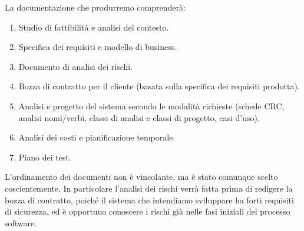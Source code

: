 \documentclass[10pt]{softeng} %
\begin{document}
La documentazione che produrremo comprender\`a:
\begin{enumerate}
	\item Studio di fattibilit\`a e analisi del contesto.
	\item Specifica dei requisiti e modello di business.
	\item Documento di analisi dei rischi.
	\item Bozza di contratto per il cliente (basata sulla specifica dei requisiti prodotta).
	\item Analisi e progetto del sistema secondo le modalit\`a richieste (schede CRC, analisi nomi/verbi, classi di analisi e classi di progetto, casi d'uso).
	\item Analisi dei costi e pianificazione temporale.
	\item Piano dei test.
\end{enumerate}
L'ordinamento dei documenti non \`e vincolante, ma \`e stato comunque scelto coscientemente.
In particolare l'analisi dei rischi verr\`a fatta prima di redigere la bozza di contratto, poich\'e il sistema che intendiamo sviluppare ha forti requisiti di sicurezza, ed \`e opportuno conoscere i rischi gi\`a nelle fasi iniziali del processo software.

\printbibliography
\end{document}
